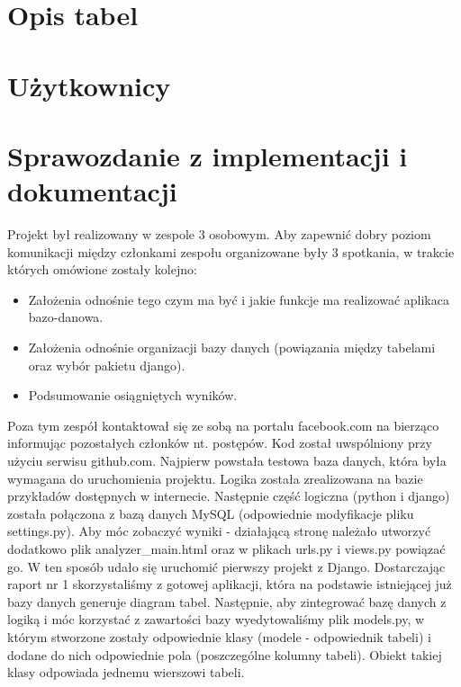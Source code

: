 \documentclass[a4paper]{article}
\begin{document}
\section{Opis tabel}


\section{Użytkownicy}


\section{Sprawozdanie z implementacji i dokumentacji}
Projekt był realizowany w zespole 3 osobowym. Aby zapewnić dobry poziom komunikacji między członkami zespołu organizowane były 3 spotkania, w trakcie których omówione zostały kolejno:
\begin{itemize}
	\item Założenia odnośnie tego czym ma być i jakie funkcje ma realizować aplikaca bazo-danowa.
	\item Założenia odnośnie organizacji bazy danych (powiązania między tabelami oraz wybór pakietu django).
	\item Podsumowanie osiągniętych wyników.
\end{itemize}
Poza tym zespół kontaktował się ze sobą na portalu facebook.com na bierząco informując pozostałych członków nt. postępów. Kod został uwspólniony przy użyciu serwisu github.com. 
\newline
Najpierw powstała testowa baza danych, która była wymagana do uruchomienia projektu. Logika została zrealizowana na bazie przykładów dostępnych w internecie. Następnie część logiczna (python i django) została połączona z bazą danych MySQL (odpowiednie modyfikacje pliku settings.py). Aby móc zobaczyć wyniki - działającą stronę należało utworzyć dodatkowo plik analyzer\_main.html oraz w plikach urls.py i views.py powiązać go. W ten sposób udało się uruchomić pierwszy projekt z Django.
\newline
Dostarczając raport nr 1 skorzystaliśmy z gotowej aplikacji, która na podstawie istniejącej już bazy danych generuje diagram tabel. 
Następnie, aby zintegrować bazę danych z logiką i móc korzystać z zawartości bazy wyedytowaliśmy plik models.py, w którym stworzone zostały odpowiednie klasy (modele - odpowiednik tabeli) i dodane do nich odpowiednie pola (poszczególne kolumny tabeli). Obiekt takiej klasy odpowiada jednemu wierszowi tabeli. 
\newline
\end{document}
